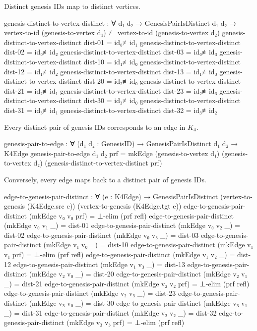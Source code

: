 \documentclass[11pt,a4paper]{book}
\begin{document}
Distinct genesis IDs map to distinct vertices.

\begin{code}
genesis-distinct-to-vertex-distinct : ∀ {d₁ d₂} → GenesisPairIsDistinct d₁ d₂ → 
  vertex-to-id (genesis-to-vertex d₁) ≢ vertex-to-id (genesis-to-vertex d₂)
genesis-distinct-to-vertex-distinct dist-01 = id₀≢id₁
genesis-distinct-to-vertex-distinct dist-02 = id₀≢id₂
genesis-distinct-to-vertex-distinct dist-03 = id₀≢id₃
genesis-distinct-to-vertex-distinct dist-10 = id₁≢id₀
genesis-distinct-to-vertex-distinct dist-12 = id₁≢id₂
genesis-distinct-to-vertex-distinct dist-13 = id₁≢id₃
genesis-distinct-to-vertex-distinct dist-20 = id₂≢id₀
genesis-distinct-to-vertex-distinct dist-21 = id₂≢id₁
genesis-distinct-to-vertex-distinct dist-23 = id₂≢id₃
genesis-distinct-to-vertex-distinct dist-30 = id₃≢id₀
genesis-distinct-to-vertex-distinct dist-31 = id₃≢id₁
genesis-distinct-to-vertex-distinct dist-32 = id₃≢id₂

\end{code}

Every distinct pair of genesis IDs corresponds to an edge in $K_4$.

\begin{code}
genesis-pair-to-edge : ∀ (d₁ d₂ : GenesisID) → GenesisPairIsDistinct d₁ d₂ → K4Edge
genesis-pair-to-edge d₁ d₂ prf = 
  mkEdge (genesis-to-vertex d₁) (genesis-to-vertex d₂) (genesis-distinct-to-vertex-distinct prf)

\end{code}

Conversely, every edge maps back to a distinct pair of genesis IDs.

\begin{code}
edge-to-genesis-pair-distinct : ∀ (e : K4Edge) → 
  GenesisPairIsDistinct (vertex-to-genesis (K4Edge.src e)) (vertex-to-genesis (K4Edge.tgt e))
edge-to-genesis-pair-distinct (mkEdge v₀ v₀ prf) = ⊥-elim (prf refl)
edge-to-genesis-pair-distinct (mkEdge v₀ v₁ _) = dist-01
edge-to-genesis-pair-distinct (mkEdge v₀ v₂ _) = dist-02
edge-to-genesis-pair-distinct (mkEdge v₀ v₃ _) = dist-03
edge-to-genesis-pair-distinct (mkEdge v₁ v₀ _) = dist-10
edge-to-genesis-pair-distinct (mkEdge v₁ v₁ prf) = ⊥-elim (prf refl)
edge-to-genesis-pair-distinct (mkEdge v₁ v₂ _) = dist-12
edge-to-genesis-pair-distinct (mkEdge v₁ v₃ _) = dist-13
edge-to-genesis-pair-distinct (mkEdge v₂ v₀ _) = dist-20
edge-to-genesis-pair-distinct (mkEdge v₂ v₁ _) = dist-21
edge-to-genesis-pair-distinct (mkEdge v₂ v₂ prf) = ⊥-elim (prf refl)
edge-to-genesis-pair-distinct (mkEdge v₂ v₃ _) = dist-23
edge-to-genesis-pair-distinct (mkEdge v₃ v₀ _) = dist-30
edge-to-genesis-pair-distinct (mkEdge v₃ v₁ _) = dist-31
edge-to-genesis-pair-distinct (mkEdge v₃ v₂ _) = dist-32
edge-to-genesis-pair-distinct (mkEdge v₃ v₃ prf) = ⊥-elim (prf refl)

\end{code}
\end{document}
